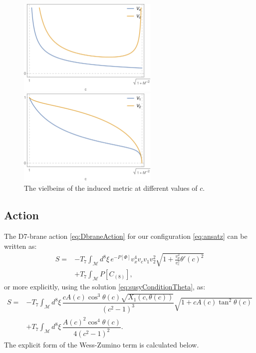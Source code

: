 \begin{figure}[t!]
\begin{center}
\includegraphics[width=0.6\textwidth]{pictures/vxvc.png}
\end{center}
\vspace{0.05mm}
\begin{center}
\includegraphics[width=0.6\textwidth]{pictures/v1v2.png}
\end{center}
\caption{\label{fig:vielbeins} The vielbeins of the induced metric at different values of $c$.}
\end{figure}



\subsection{Action}


The D7-brane action \eqref{eq:DbraneAction} for our configuration \eqref{eq:ansatz} can be written as:
\begin{align}
 S  = & -T_7 \int_\mathcal{M} d^8\xi \, e^{-P[\Phi] } v_x^4 v_c v_1 v_2^2 \sqrt{1+\frac{v_\theta^2}{v_c^2}\theta'(c)^2}  \nonumber \\
      & + T_7\int _\mathcal{M} P[C_{(8)}],
\end{align}
or more explicitly, using the solution \eqref{eq:susyConditionTheta}, as:
\begin{align}\label{eq:ActionWithTheta'}
 S = & -T_7 \int_\mathcal{M} d^8\xi \, \dfrac{c A(c) \cos^3\theta (c) \sqrt{X_1(c, \theta(c))}}{\left(c^2-1\right)^3} \sqrt{1+ c A(c) \tan^2\theta(c)} \nonumber \\
     & +T_7\int _\mathcal{M} d^8\xi \, \dfrac{A(c)^2 \cos^4\theta(c)}{4 \left(c^2-1\right)^2}.
\end{align}
The explicit form of the Wess-Zumino term is calculated below.

